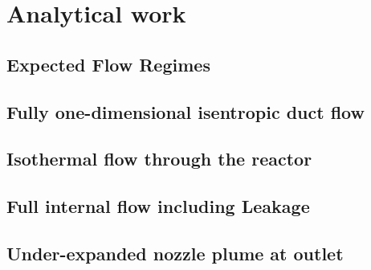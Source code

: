 \section{Analytical work}

\subsection{Expected Flow Regimes}

\newpage

\subsection{Fully one-dimensional isentropic duct flow}

\newpage

\subsection{Isothermal flow through the reactor}

\newpage

\subsection{Full internal flow including Leakage}

\newpage

\subsection{Under-expanded nozzle plume at outlet}

\newpage
